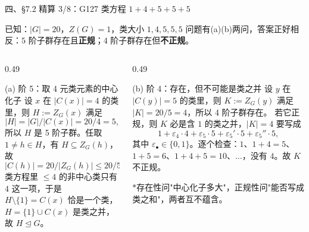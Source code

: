 \documentclass[aspectratio=169,10pt,fontset=none]{ctexbeamer}
\newcommand{\starpt}{\textcolor{accent}{\bfseries$\ast$}}
\begin{document}
\begin{frame}[t]{四、\S7.2 精算 3/8：G127 类方程 $1+4+5+5+5$}
  \begin{block}{已知：$|G|=20$，$Z(G)=1$，类大小 $1,4,5,5,5$}
    \scriptsize
    问题有(a)(b)两问，答案正好相反：$5$ 阶子群存在且\textbf{正规}；$4$ 阶子群存在但\textbf{不正规}。
  \end{block}
  \begin{columns}[T,onlytextwidth]
    \begin{column}{0.49\textwidth}
      \begin{exampleblock}{\footnotesize (a) 阶 5：取 4 元类元素的中心化子}
        \scriptsize
        设 $x$ 在 $|C(x)|=4$ 的类里，则 $H:=Z_G(x)$ 满足
        \[ |H|=|G|/|C(x)|=20/4=5, \]
        所以 $H$ 是 5 阶子群。任取 $1\ne h\in H$，有 $H\subseteq Z_G(h)$，故
        \[ |C(h)|=20/|Z_G(h)|\le 20/5=4. \]
        类方程里 $\le4$ 的非中心类只有 $4$ 这一项，于是 $H\setminus\{1\}=C(x)$ 恰是一个类，$H=\{1\}\cup C(x)$ 是类之并，故 $H\trianglelefteq G$。
      \end{exampleblock}
    \end{column}
    \begin{column}{0.49\textwidth}
      \begin{alertblock}{\footnotesize (b) 阶 4：存在，但不可能是类之并}
        \scriptsize
        设 $y$ 在 $|C(y)|=5$ 的类里，则 $K:=Z_G(y)$ 满足 $|K|=20/5=4$，所以 4 阶子群存在。
        若它正规，则 $K$ 必是含 $1$ 的类之并，$|K|=4$ 要写成
        \[ 1+\varepsilon_4\cdot4+\varepsilon_5\cdot5+\varepsilon_5'\cdot5+\varepsilon_5''\cdot5, \]
        其中 $\varepsilon_\bullet\in\{0,1\}$。逐个检查：$1$、$1+4=5$、$1+5=6$、$1+4+5=10$、$\dots$，没有 $4$。故 $K$ 不正规。
      \end{alertblock}
      \footnotesize\color{ink!80}
      \starpt 存在性问"中心化子多大"，正规性问"能否写成类之和"，两者互不蕴含。
    \end{column}
  \end{columns}
\end{frame}
\end{document}
